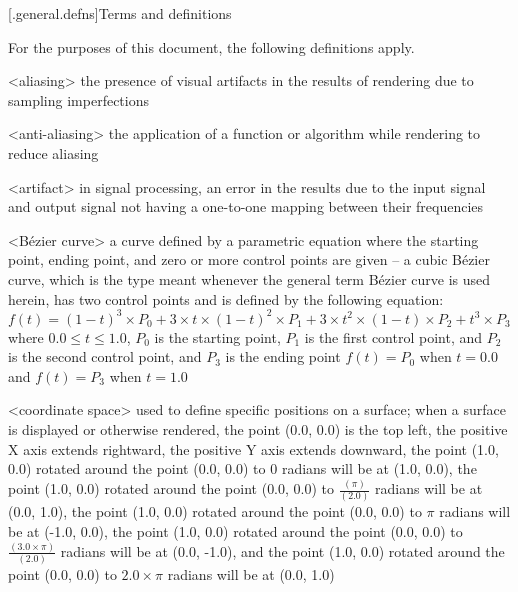 [\iotwod.general.defns]{Terms and definitions}

\pnum
{}%
For the purposes of this document, the following definitions apply.

%
<aliasing> the presence of visual artifacts in the results of rendering due to 
sampling imperfections

%
<anti-aliasing> the application of a function or algorithm while rendering to 
reduce aliasing

<artifact> in signal processing, an error in the results due to the input 
signal and output signal not having a one-to-one mapping between their 
frequencies

<B\'ezier curve> a curve defined by a parametric equation where the starting 
point, ending point, and zero or more control points are given -- a cubic 
B\'ezier curve, which is the type meant whenever the general term B\'ezier 
curve is used herein, has two control points and is defined by the following 
equation: $f(t) = (1 - t)^{3} \times P_{0} + 3 \times t \times (1 - t)^{2} 
\times P_{1} + 3 \times t^{2} \times (1 - t) \times P_{2} + t^{3} \times P_{3}$ 
where $0.0 \le t \le 1.0$, $P_{0}$ is the starting point, $P_{1}$ is the first 
control point, and $P_{2}$ is the second control point, and $P_{3}$ is the 
ending 
point
\enternote
$f(t) = P_{0}$ when $t = 0.0$ and $f(t) = P_{3}$ when $t = 1.0$
\exitnote

<coordinate space> used to define specific positions on a surface; when a 
surface is displayed or otherwise rendered, the point (0.0, 0.0) is the top 
left, the positive X axis extends rightward, the positive Y axis extends 
downward, the point (1.0, 0.0) rotated around the point (0.0, 0.0) to $0$ 
radians will be at (1.0, 0.0), the point (1.0, 0.0) rotated around the point 
(0.0, 0.0) to $\frac{(\pi)}{(2.0)}$ radians will be at (0.0, 1.0), the point 
(1.0, 0.0) rotated around the point (0.0, 0.0) to $\pi$ radians will be at 
(-1.0, 0.0), the point (1.0, 0.0) rotated around the point (0.0, 0.0) to 
$\frac{(3.0 \times \pi)}{(2.0)}$ radians will be at (0.0, -1.0), and the point 
(1.0, 0.0) rotated around the point (0.0, 0.0) to $2.0 \times \pi$ 
radians will be at (0.0, 1.0)


